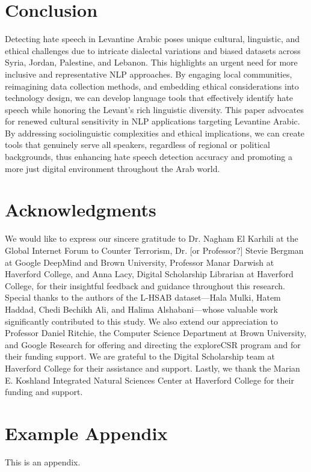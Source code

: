 \documentclass[11pt]{article}
\begin{document}
\section{Conclusion}

Detecting hate speech in Levantine Arabic poses unique cultural, linguistic, and ethical challenges due to intricate dialectal variations and biased datasets across Syria, Jordan, Palestine, and Lebanon. This highlights an urgent need for more inclusive and representative NLP approaches. By engaging local communities, reimagining data collection methods, and embedding ethical considerations into technology design, we can develop language tools that effectively identify hate speech while honoring the Levant's rich linguistic diversity. This paper advocates for renewed cultural sensitivity in NLP applications targeting Levantine Arabic. By addressing sociolinguistic complexities and ethical implications, we can create tools that genuinely serve all speakers, regardless of regional or political backgrounds, thus enhancing hate speech detection accuracy and promoting a more just digital environment throughout the Arab world.



\section*{Acknowledgments}

We would like to express our sincere gratitude to Dr. Nagham El Karhili at the Global Internet Forum to Counter Terrorism, Dr. [or Professor?] Stevie Bergman at Google DeepMind and Brown University, Professor Manar Darwish at Haverford College, and Anna Lacy, Digital Scholarship Librarian at Haverford College, for their insightful feedback and guidance throughout this research. Special thanks to the authors of the L-HSAB dataset—Hala Mulki, Hatem Haddad, Chedi Bechikh Ali, and Halima Alshabani—whose valuable work significantly contributed to this study. We also extend our appreciation to Professor Daniel Ritchie, the Computer Science Department at Brown University, and Google Research for offering and directing the exploreCSR program and for their funding support. We are grateful to the Digital Scholarship team at Haverford College for their assistance and support. Lastly, we thank the Marian E. Koshland Integrated Natural Sciences Center at Haverford College for their funding and support.



%


\appendix

\section{Example Appendix}
\label{sec:appendix}

This is an appendix.
\end{document}
